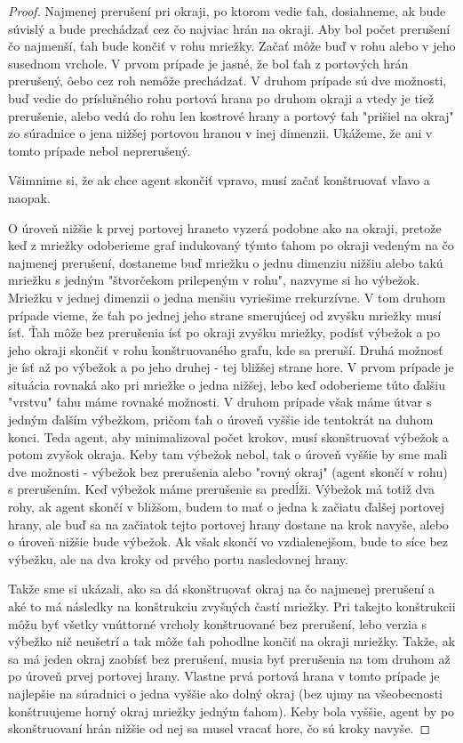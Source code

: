 \begin{proof}
Najmenej prerušení pri okraji, po ktorom vedie ťah, dosiahneme, ak bude
súvislý a bude prechádzať cez čo najviac hrán na okraji. Aby bol počet
prerušení čo najmenší, ťah bude končiť v rohu mriežky. Začať môže buď v rohu
alebo v jeho susednom vrchole. V prvom prípade je jasné, že bol ťah z
portových hrán prerušený, ôebo cez roh nemôže prechádzať. V druhom prípade
sú dve možnosti, buď vedie do príslušného rohu portová hrana po druhom
okraji a vtedy je tiež prerušenie, alebo vedú do rohu len kostrové hrany a
portový ťah "prišiel na okraj" zo súradnice o jena nižšej portovou hranou v
inej dimenzii. Ukážeme, že ani v tomto prípade nebol neprerušený.

Všimnime si, že ak chce agent skončiť vpravo, musí začať konštruovať vľavo a
naopak.

O úroveň nižšie k prvej portovej hraneto vyzerá podobne ako na okraji,
pretože keď z mriežky odoberieme graf indukovaný týmto ťahom po okraji
vedeným na čo najmenej prerušení, dostaneme buď mriežku o jednu dimenziu
nižšiu alebo takú mriežku s jedným "štvorčekom prilepeným v rohu", nazvyme
si ho výbežok. Mriežku v
jednej dimenzii o jedna menšiu vyriešime rrekurzívne. V tom druhom prípade
vieme, že ťah  po jednej jeho
strane smerujúcej od zvyšku mriežky musí ísť. Ťah môže bez prerušenia ísť po
okraji zvyšku mriežky, podísť výbežok a po jeho okraji skončiť v rohu
konštruovaného grafu, kde sa preruší. Druhá možnosť je ísť až po výbežok a
po jeho druhej - tej bližšej strane hore. V prvom prípade je situácia
rovnaká ako pri mriežke o jedna nižšej, lebo keď odoberieme túto ďalšiu
"vrstvu" ťahu máme rovnaké možnosti. V druhom prípade však máme útvar s
jedným ďalším výbežkom, pričom ťah o úroveň vyššie ide tentokrát na duhom
konci. Teda agent, aby minimalizoval počet krokov, musí skonštruovať výbežok 
a potom zvyšok okraja. Keby tam výbežok nebol, tak o úroveň vyššie by sme
mali dve možnosti - výbežok bez prerušenia alebo "rovný okraj" (agent skončí
v rohu) s prerušením. Keď výbežok máme prerušenie sa predĺži. Výbežok má
totiž dva rohy, ak agent skončí v bližšom, budem to mať o jedna k začiatu
ďalšej portovej hrany, ale buď sa na začiatok tejto portovej hrany dostane
na krok navyše, alebo o úroveň nižšie bude výbežok. Ak však skončí vo
vzdialenejšom, bude to síce bez výbežku, ale na dva kroky od prvého portu
nasledovnej hrany.

Takže sme si ukázali, ako sa dá skonštruovať okraj na čo najmenej prerušení a aké
to má následky na konštrukciu zvyšných častí mriežky. Pri takejto
konštrukcii môžu byť všetky vnúttorné vrcholy konštruované bez prerušení,
lebo verzia s výbežko nič neušetrí a tak môže ťah pohodlne končiť na okraji
mriežky. Takže, ak sa má jeden okraj zaobísť bez prerušení, musia byť
prerušenia na tom druhom až po úroveň prvej portovej hrany. Vlastne prvá
portová hrana v tomto prípade je najlepšie na súradnici o jedna vyššie ako
dolný okraj (bez ujmy na všeobecnosti konštruujeme horný okraj mriežky
jedným ťahom). Keby bola vyššie, agent by po skonštruovaní hrán nižšie od
nej sa musel vracať hore, čo sú kroky navyše.


\end{proof}
